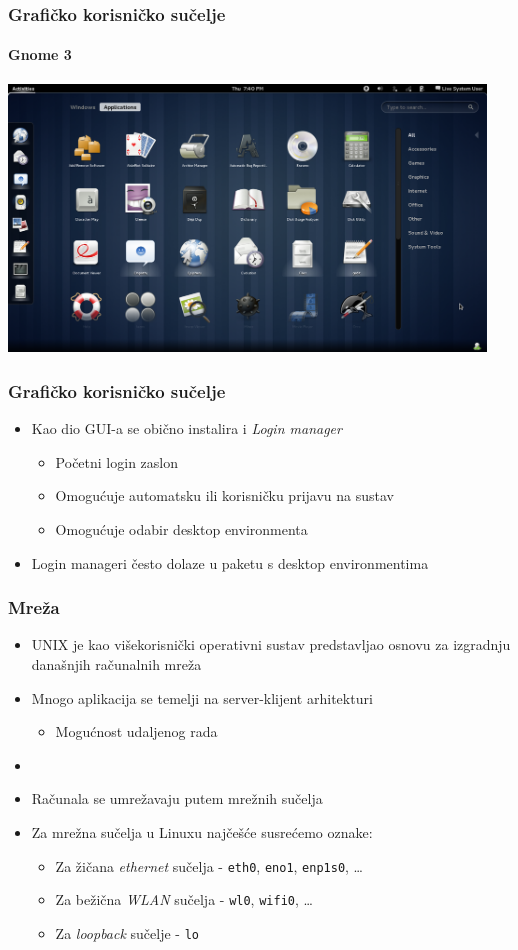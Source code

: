 \documentclass[table,usenames,dvipsnames]{beamer}
\newcommand{\shell}[1]{\texttt{#1}}
\begin{document}
\begin{frame}[t]
	\frametitle{Grafičko korisničko sučelje}
	\framesubtitle{Gnome 3}
	\centering \includegraphics[width=0.95\textwidth]{gnome3.png}
\end{frame}

\begin{frame}[t]
	\frametitle{Grafičko korisničko sučelje}
	\begin{itemize}
		\item Kao dio GUI-a se obično instalira i \emph{Login manager}
		\begin{itemize}
			\item Početni login zaslon
			\item Omogućuje automatsku ili korisničku prijavu na sustav
			\item Omogućuje odabir desktop environmenta
		\end{itemize}
		\item Login manageri često dolaze u paketu s desktop environmentima
	\end{itemize}
\end{frame}

\begin{frame}[t]
	\frametitle{Mreža}
	\begin{itemize}
		\item UNIX je kao višekorisnički operativni sustav predstavljao osnovu za izgradnju današnjih računalnih mreža
		\item Mnogo aplikacija se temelji na server-klijent arhitekturi
		\begin{itemize}
			\item Mogućnost udaljenog rada
		\end{itemize}
		\item[]
		\item Računala se umrežavaju putem mrežnih sučelja
		\item Za mrežna sučelja u Linuxu najčešće susrećemo oznake:
		\begin{itemize}
			\item Za žičana \emph{ethernet} sučelja - \shell{eth0}, \shell{eno1}, \shell{enp1s0}, \ldots
			\item Za bežična \emph{WLAN} sučelja - \shell{wl0}, \shell{wifi0}, \ldots
			\item Za \emph{loopback} sučelje - \shell{lo}
		\end{itemize}
	\end{itemize}
\end{frame}
\end{document}
